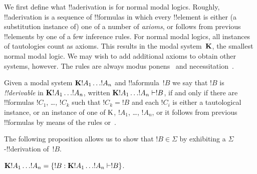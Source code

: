 \documentclass[../../../include/open-logic-section]{subfiles}
\begin{document}


We first define what !!a{derivation} is for normal modal
logics. Roughly, !!a{derivation} is a sequence of !!{formula}s in
which every !!{element} is either (a substitution instance of) one of
a number of \emph{axioms}, or follows from previous !!{element}s by
one of a few inference rules. For normal modal logics, all instances
of tautologies
count as axioms. This results in the modal system~$\Log{K}$, the
smallest normal modal logic. We may wish to add additional axioms to
obtain other systems, however. The rules are always modus ponens~\MP{}
and necessitation~\Nec.

\begin{defn}
  Given a modal system $\Log{K} !A_1 \dots !A_n$ and !!a{formula}~$!B$
  we say that $!B$ is \emph{!!{derivable}} in $\Log{K} !A_1 \dots
  !A_n$, written $\Log{K} !A_1 \dots !A_n \Proves !B$, if and only if
  there are !!{formula}s $!C_1$, \dots, $!C_k$ such that $!C_k = !B$
  and each $!C_i$ is either a tautological instance, or an instance of
  one of $\mathrm{K}$, $!A_1$,
  \dots, $!A_n$, or it follows from previous !!{formula}s by means of
  the rules \MP{} or~\Nec.
\end{defn}

The following proposition allows us to show that $!B \in \Sigma$
by exhibiting a $\Sigma$-!!{derivation} of~$!B$.

\begin{prop}
  $\Log{K} !A_1 \dots !A_n = \Setabs{!B}{\Log{K} !A_1 \dots !A_n \Proves !B}$.
\end{prop}
\end{document}

